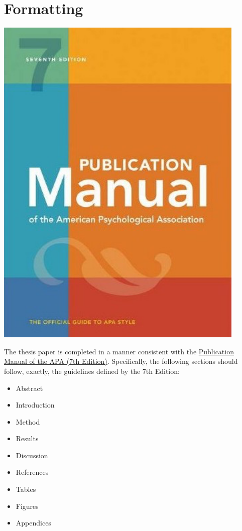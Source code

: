 \documentclass[openany]{book}
\providecommand{\tightlist}{%
  \setlength{\itemsep}{0pt}\setlength{\parskip}{0pt}}
\begin{document}
\hypertarget{formatting}{%
\chapter{Formatting}\label{formatting}}

\includegraphics[width=4.72in]{images/apamanual}

The thesis paper is completed in a manner consistent with the \href{https://www.amazon.com/s?k=apa+publication+manual+7th+edition\&crid=7T10VJ2PYQZH\&sprefix=apa+pu\%2Caps\%2C261\&ref=nb_sb_ss_i_1_6}{Publication Manual of the APA (7th Edition)}. Specifically, the following sections should follow, exactly, the guidelines defined by the 7th Edition:

\begin{itemize}
\tightlist
\item
  Abstract
\item
  Introduction
\item
  Method
\item
  Results
\item
  Discussion
\item
  References
\item
  Tables
\item
  Figures
\item
  Appendices
\end{itemize}
\end{document}
